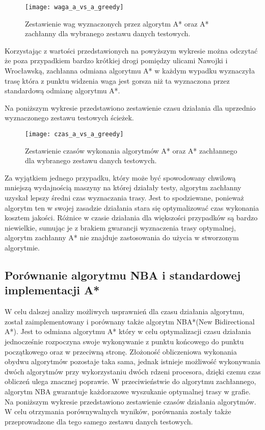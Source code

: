 \begin{figure}[H]
\centering
\texttt{[image: waga\_a\_vs\_a\_greedy]}
\caption{Zestawienie wag wyznaczonych przez algorytm A* oraz A* zachłanny dla wybranego zestawu danych testowych.}
\end{figure}

Korzystając z wartości przedstawionych na powyższym wykresie można odczytać że poza przypadkiem bardzo krótkiej drogi pomiędzy ulicami Nawojki i Wrocławską, zachłanna odmiana algorytmu A* w każdym wypadku wyznaczyła trasę która z punktu widzenia waga jest gorsza niż ta wyznaczona przez standardową odmianę algorytmu A*.

Na poniższym wykresie przedstawiono zestawienie czasu działania dla uprzednio wyznaczonego zestawu testowych ścieżek.

\begin{figure}[H]
\centering
\texttt{[image: czas\_a\_vs\_a\_greedy]}
\caption{Zestawienie czasów wykonania algorytmów A* oraz A* zachłannego dla wybranego zestawu danych testowych.}
\end{figure}

Za wyjątkiem jednego przypadku, który może być spowodowany chwilową mniejszą wydajnością maszyny na której działały testy, algorytm zachłanny uzyskał lepszy średni czas wyznaczania trasy. Jest to spodziewane, ponieważ algorytm ten w swojej zasadzie działania stara się optymalizować czas wykonania kosztem jakości. Różnice w czasie działania dla większości przypadków są bardzo niewielkie, sumując je z brakiem gwarancji wyznaczenia trasy optymalnej, algorytm zachłanny A* nie znajduje zastosowania do użycia w stworzonym algorytmie.

\subsection{Porównanie algorytmu NBA i standardowej implementacji A*}

W celu dalszej analizy możliwych usprawnień dla czasu działania algorytmu, został zaimplementowany i porównany także algorytm NBA*(New Bidirectional A*). Jest to odmiana algorytmu A* który w celu optymalizacji czasu działania jednocześnie rozpoczyna swoje wykonywanie z punktu końcowego do punktu początkowego oraz w przeciwną stronę. Złożoność obliczeniowa wykonania obydwu algorytmów pozostaje taka sama, jednak istnieje możliwość wykonywania dwóch algorytmów przy wykorzystaniu dwóch rdzeni procesora, dzięki czemu czas obliczeń ulega znacznej poprawie. W przeciwieństwie do algorytmu zachłannego, algorytm NBA gwarantuje każdorazowe wyszukanie optymalnej trasy w grafie.
Na poniższym wykresie przedstawiono zestawienie czasów działania algorytmów. W celu otrzymania porównywalnych wyników, porównania zostały także przeprowadzone dla tego samego zestawu danych testowych.

